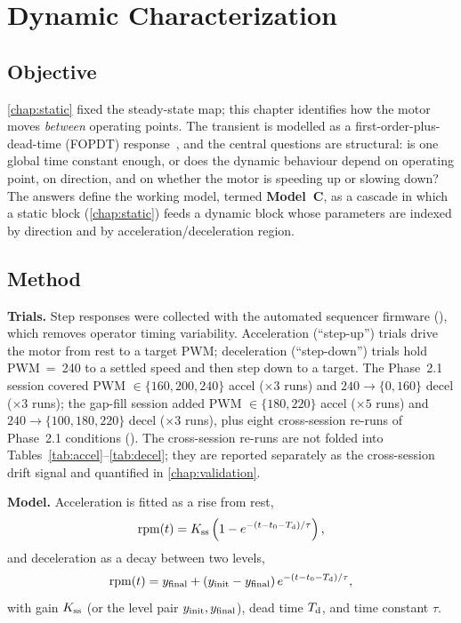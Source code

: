\chapter{Dynamic Characterization}
\label{chap:dynamic}

\section{Objective}
\label{sec:dyn-obj}

\cref{chap:static} fixed the steady-state map; this chapter identifies how the motor moves \emph{between} operating points. The transient is modelled as a first-order-plus-dead-time (FOPDT) response~\citep{seborg2016}, and the central questions are structural: is one global time constant enough, or does the dynamic behaviour depend on operating point, on direction, and on whether the motor is speeding up or slowing down? The answers define the working model, termed \textbf{Model~C}, as a cascade in which a static block (\cref{chap:static}) feeds a dynamic block whose parameters are indexed by direction and by acceleration/deceleration region.

\section{Method}
\label{sec:dyn-method}

\textbf{Trials.} Step responses were collected with the automated sequencer firmware (), which removes operator timing variability. Acceleration (``step-up'') trials drive the motor from rest to a target PWM; deceleration (``step-down'') trials hold PWM~=~240 to a settled speed and then step down to a target. The Phase~2.1 session covered PWM $\in \{160, 200, 240\}$ accel ($\times 3$ runs) and $240\to\{0, 160\}$ decel ($\times 3$ runs); the gap-fill session added PWM $\in \{180, 220\}$ accel ($\times 5$ runs) and $240\to\{100, 180, 220\}$ decel ($\times 3$ runs), plus eight cross-session re-runs of Phase~2.1 conditions (). The cross-session re-runs are not folded into Tables~\ref{tab:accel}--\ref{tab:decel}; they are reported separately as the cross-session drift signal and quantified in \cref{chap:validation}.

\textbf{Model.} Acceleration is fitted as a rise from rest,
\begin{equation}
  \mathrm{rpm}(t) = K_{\mathrm{ss}}\left(1 - e^{-(t - t_0 - T_{\mathrm{d}})/\tau}\right),
  \label{eq:accel}
\end{equation}
and deceleration as a decay between two levels,
\begin{equation}
  \mathrm{rpm}(t) = y_{\mathrm{final}} + (y_{\mathrm{init}} - y_{\mathrm{final}})\,e^{-(t - t_0 - T_{\mathrm{d}})/\tau},
  \label{eq:decel}
\end{equation}
with gain $K_{\mathrm{ss}}$ (or the level pair $y_{\mathrm{init}}, y_{\mathrm{final}}$), dead time $T_{\mathrm{d}}$, and time constant $\tau$.

